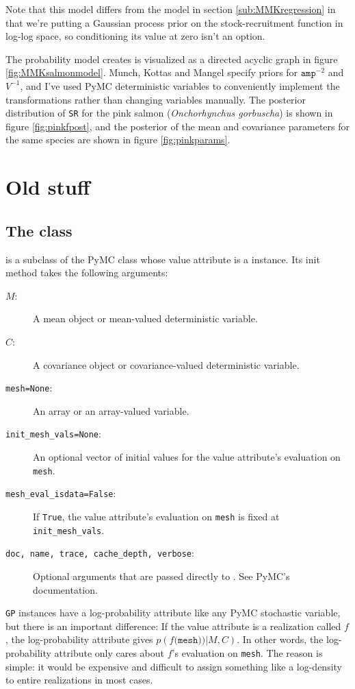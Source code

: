 Note that this model differs from the model in section \ref{sub:MMKregression} in that we're putting a Gaussian process prior on the stock-recruitment function in log-log space, so conditioning its value at zero isn't an option.

The probability model  creates is visualized as a directed acyclic graph in figure \ref{fig:MMKsalmonmodel}. Munch, Kottas and Mangel specify priors for $\texttt{amp}^{-2}$ and $V^{-1}$, and I've used PyMC deterministic variables to conveniently implement the transformations rather than changing variables manually. The posterior distribution of \texttt{SR} for the pink salmon (\emph{Onchorhynchus gorbuscha}) is shown in figure \ref{fig:pinkfpost}, and the posterior of the mean and covariance parameters for the same species are shown in figure \ref{fig:pinkparams}.


\chapter{Old stuff} 

\section{The  class}
 is a subclass of the PyMC  class whose value attribute is a  instance. Its init method takes the following arguments:
\begin{description}
    \item[$M$:] A mean object or mean-valued deterministic variable.
    \item[$C$:] A covariance object or covariance-valued deterministic variable.
    \item[\texttt{mesh=None}:] An array or an array-valued variable.
    \item[\texttt{init_mesh_vals=None}:] An optional vector of initial values for the value attribute's evaluation on \texttt{mesh}.
    \item[\texttt{mesh_eval_isdata=False}:] If \texttt{True}, the value attribute's evaluation on \texttt{mesh} is fixed at \texttt{init_mesh_vals}.
    \item[\texttt{doc, name, trace, cache_depth, verbose}:] Optional arguments that are passed directly to . See PyMC's documentation.
\end{description}

\texttt{GP} instances have a log-probability attribute like any PyMC stochastic variable, but there is an important difference: If the value attribute is a realization called $f$, the log-probability attribute gives $p(f\texttt{(mesh))}|M,C)$. In other words, the log-probability attribute only cares about $f$'s evaluation on \texttt{mesh}. The reason is simple: it would be expensive and difficult to assign something like a log-density to entire realizations in most cases.

